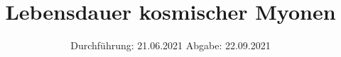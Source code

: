 

\subject{V 01}
\title{Lebensdauer kosmischer Myonen}
\date{%
  Durchführung: 21.06.2021
  \hspace{3em}
  Abgabe: 22.09.2021
}



\maketitle
\thispagestyle{empty}
\tableofcontents
\newpage







\printbibliography{}


